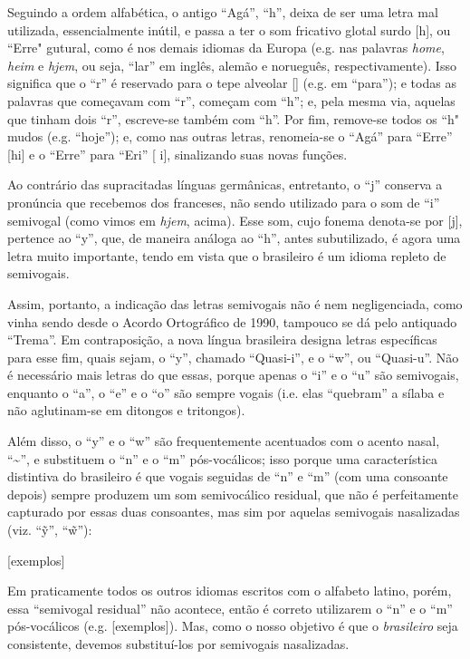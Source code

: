 \documentclass[12pt, a5paper, titlepage]{article}
\begin{document}
\begin{bilingualpages}
    Seguindo a ordem alfabética, o antigo ``Agá'', ``h'', deixa de ser uma letra
    mal utilizada, essencialmente inútil, e passa a ter o som fricativo glotal
    surdo [h], ou ``Erre" gutural, como é nos demais idiomas da Europa (e.g. nas
    palavras \textit{home}, \textit{heim} e \textit{hjem}, ou seja, ``lar'' em
    inglês, alemão e norueguês, respectivamente). Isso significa que o ``r'' é
    reservado para o tepe alveolar [\textfishhookr] (e.g. em ``para''); e todas as
    palavras que começavam com ``r'', começam com ``h''; e, pela mesma via, aquelas
    que tinham dois ``r'', escreve-se também com ``h''. Por fim, remove-se todos os
    ``h" mudos (e.g. ``hoje''); e, como nas outras letras, renomeia-se o ``Agá''
    para ``Erre'' [\textepsilon hi] e o ``Erre'' para ``Eri'' [\textepsilon
    \textfishhookr i], sinalizando suas novas funções.

    Ao contrário das supracitadas línguas germânicas, entretanto, o ``j'' conserva
    a pronúncia que recebemos dos franceses, não sendo utilizado para o som de
    ``i'' semivogal (como vimos em \textit{hjem}, acima). Esse som, cujo fonema
    denota-se por [j], pertence ao ``y'', que, de maneira análoga ao ``h'', antes
    subutilizado, é agora uma letra muito importante, tendo em vista que o
    brasileiro é um idioma repleto de semivogais.

    Assim, portanto, a indicação das letras semivogais não é nem negligenciada,
    como vinha sendo desde o Acordo Ortográfico de 1990, tampouco se dá pelo
    antiquado ``Trema''. Em contraposição, a nova língua brasileira designa letras
    específicas para esse fim, quais sejam, o ``y'', chamado ``Quasi-i'', e o
    ``w'', ou ``Quasi-u''. Não é necessário mais letras do que essas, porque apenas
    o ``i'' e o ``u'' são semivogais, enquanto o ``a'', o ``e'' e o ``o'' são
    sempre vogais (i.e. elas ``quebram'' a sílaba e não aglutinam-se em ditongos e
    tritongos).

    Além disso, o ``y'' e o ``w'' são frequentemente acentuados com o acento nasal,
    ``\textasciitilde'', e substituem o ``n'' e o ``m'' pós-vocálicos; isso porque
    uma característica distintiva do brasileiro é que vogais seguidas de ``n'' e
    ``m'' (com uma consoante depois) sempre produzem um som semivocálico residual,
    que não é perfeitamente capturado por essas duas consoantes, mas sim por
    aquelas semivogais nasalizadas (viz. ``\~y'', ``\~w''):

    [exemplos]

    Em praticamente todos os outros idiomas escritos com o alfabeto latino, porém,
    essa ``semivogal residual'' não acontece, então é correto utilizarem o ``n'' e
    o ``m'' pós-vocálicos (e.g. [exemplos]). Mas, como o nosso objetivo é que o
    \textit{brasileiro} seja consistente, devemos substituí-los por semivogais
    nasalizadas.


\end{bilingualpages}
\end{document}
